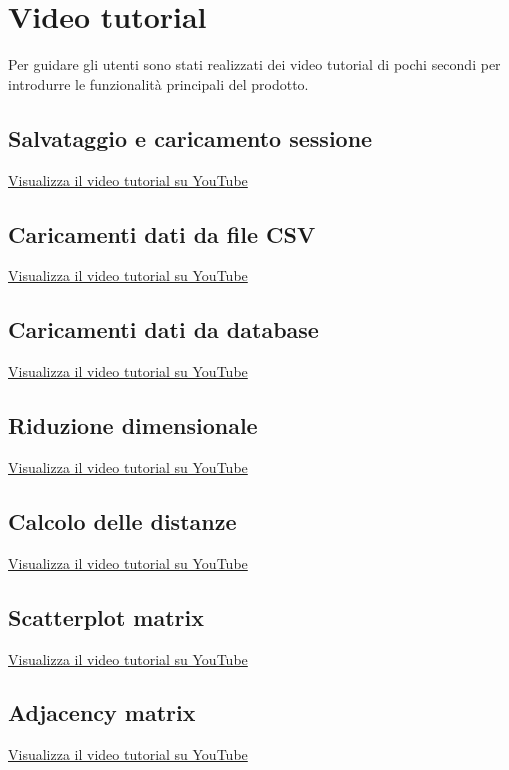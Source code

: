 \section{Video tutorial}
Per guidare gli utenti sono stati realizzati dei video tutorial di pochi secondi per introdurre le funzionalità principali del prodotto.

\subsection{Salvataggio e caricamento sessione}
\textcolor{blue}{\href{https://youtu.be/klcikIUolXc}
{Visualizza il video tutorial su YouTube}}

\subsection{Caricamenti dati da file CSV}
\textcolor{blue}{\href{https://youtu.be/7NIiFvb8XLY}
{Visualizza il video tutorial su YouTube}}

\subsection{Caricamenti dati da database}
\textcolor{blue}{\href{https://youtu.be/MJ0WDG5yX-Y}
{Visualizza il video tutorial su YouTube}}

\subsection{Riduzione dimensionale}
\textcolor{blue}{\href{https://youtu.be/HSNzSRYAfGc}
{Visualizza il video tutorial su YouTube}}

\subsection{Calcolo delle distanze}
\textcolor{blue}{\href{https://youtu.be/uEAzlijpLmM}
{Visualizza il video tutorial su YouTube}}

\subsection{Scatterplot matrix}
\textcolor{blue}{\href{https://youtu.be/1YtSDGRU8N8}
{Visualizza il video tutorial su YouTube}}

\subsection{Adjacency matrix}
\textcolor{blue}{\href{https://youtu.be/UQl7Rl9yRAQ}
{Visualizza il video tutorial su YouTube}}

